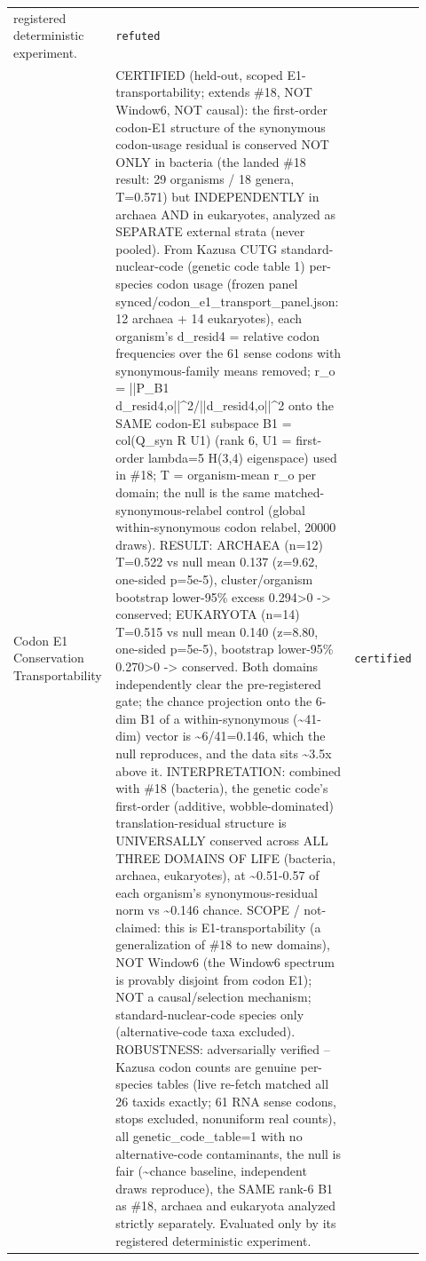 \begin{longtable}{>{\raggedright\arraybackslash}p{0.22\linewidth}>{\raggedright\arraybackslash}p{0.55\linewidth}>{\raggedright\arraybackslash}p{0.15\linewidth}}
registered deterministic experiment. & \texttt{refuted} \\
Codon E1 Conservation Transportability & CERTIFIED (held-out, scoped E1-transportability; extends \#18, NOT Window6, NOT causal): the first-order codon-E1 structure of the synonymous codon-usage residual is conserved NOT ONLY in bacteria (the landed \#18 result: 29 organisms / 18 genera, T=0.571) but INDEPENDENTLY in archaea AND in eukaryotes, analyzed as SEPARATE external strata (never pooled). From Kazusa CUTG standard-nuclear-code (genetic code table 1) per-species codon usage (frozen panel synced/codon\_e1\_transport\_panel.json: 12 archaea + 14 eukaryotes), each organism's d\_resid4 = relative codon frequencies over the 61 sense codons with synonymous-family means removed; r\_o = ||P\_B1 d\_resid4,o||\textasciicircum{}2/||d\_resid4,o||\textasciicircum{}2 onto the SAME codon-E1 subspace B1 = col(Q\_syn R U1) (rank 6, U1 = first-order lambda=5 H(3,4) eigenspace) used in \#18; T = organism-mean r\_o per domain; the null is the same matched-synonymous-relabel control (global within-synonymous codon relabel, 20000 draws). RESULT: ARCHAEA (n=12) T=0.522 vs null mean 0.137 (z=9.62, one-sided p=5e-5), cluster/organism bootstrap lower-95\% excess 0.294>0 -> conserved; EUKARYOTA (n=14) T=0.515 vs null mean 0.140 (z=8.80, one-sided p=5e-5), bootstrap lower-95\% 0.270>0 -> conserved. Both domains independently clear the pre-registered gate; the chance projection onto the 6-dim B1 of a within-synonymous (\textasciitilde{}41-dim) vector is \textasciitilde{}6/41=0.146, which the null reproduces, and the data sits \textasciitilde{}3.5x above it. INTERPRETATION: combined with \#18 (bacteria), the genetic code's first-order (additive, wobble-dominated) translation-residual structure is UNIVERSALLY conserved across ALL THREE DOMAINS OF LIFE (bacteria, archaea, eukaryotes), at \textasciitilde{}0.51-0.57 of each organism's synonymous-residual norm vs \textasciitilde{}0.146 chance. SCOPE / not-claimed: this is E1-transportability (a generalization of \#18 to new domains), NOT Window6 (the Window6 spectrum is provably disjoint from codon E1); NOT a causal/selection mechanism; standard-nuclear-code species only (alternative-code taxa excluded). ROBUSTNESS: adversarially verified -- Kazusa codon counts are genuine per-species tables (live re-fetch matched all 26 taxids exactly; 61 RNA sense codons, stops excluded, nonuniform real counts), all genetic\_code\_table=1 with no alternative-code contaminants, the null is fair (\textasciitilde{}chance baseline, independent draws reproduce), the SAME rank-6 B1 as \#18, archaea and eukaryota analyzed strictly separately. Evaluated only by its registered deterministic experiment. & \texttt{certified} \\

\end{longtable}

